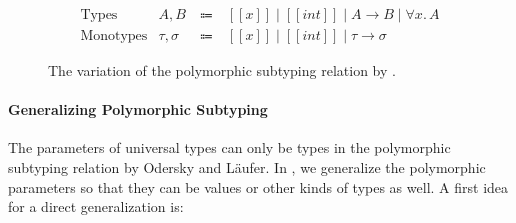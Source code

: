 \begin{figure}
\centering
\begin{equation*}
\begin{array}{llcl}
  \text{Types} & A, B & ~\Coloneqq~ & [[x]] \mid [[int]] \mid A \rightarrow B \mid \forall x.\, A \\
  \text{Monotypes} & \tau, \sigma & ~\Coloneqq~ & [[x]] \mid [[int]] \mid \tau \rightarrow \sigma
\end{array}
\end{equation*}

\caption{The \cite{dunfield2013complete} variation of the polymorphic subtyping relation by \cite{odersky1996putting}.}
\label{fig:polymorphic-subtyping}
\end{figure}

\paragraph{Generalizing Polymorphic Subtyping}
\label{sec:polymorphic-subtyping}

The parameters of universal types can only be types in the polymorphic
subtyping relation by Odersky and L\"aufer.
In \name, we generalize the polymorphic parameters so that they can
be values or other kinds of types as well.
A first idea for a direct generalization is:


